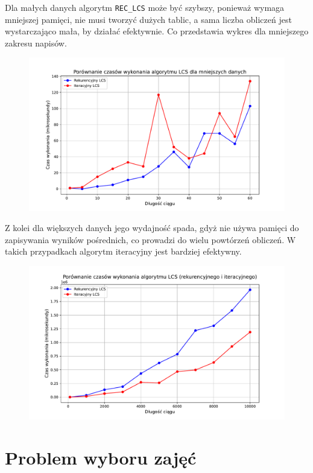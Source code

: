 \documentclass{article}
\begin{document}
	
	Dla małych danych algorytm \texttt{REC\_LCS} może być szybszy, ponieważ wymaga mniejszej pamięci, nie musi tworzyć dużych tablic, a sama liczba obliczeń jest wystarczająco mała, by działać efektywnie. Co przedstawia wykres dla mniejszego zakresu napisów.
	
	\begin{figure}[H]
	\centering
	\includegraphics[width=1\textwidth]{wykres4.pdf}
	\end{figure}
	
	Z kolei dla większych danych jego wydajność spada, gdyż nie używa pamięci do zapisywania wyników pośrednich, co prowadzi do wielu powtórzeń obliczeń. W takich przypadkach algorytm iteracyjny jest bardziej efektywny.
	
		\begin{figure}[H]
		\centering
		\includegraphics[width=1\textwidth]{wykres3.pdf}
	\end{figure}
	\section{Problem wyboru zajęć}
\end{document}
